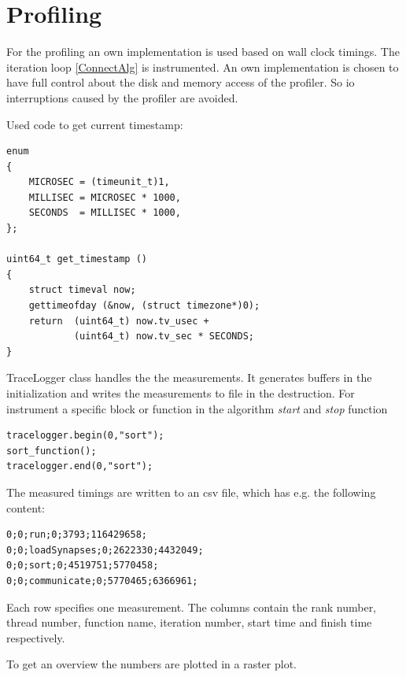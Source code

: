 %

\chapter{Profiling}

For the profiling an own implementation is used based on wall clock timings.
The iteration loop \ref{ConnectAlg} is instrumented. An own implementation is
chosen to have full control about the disk and memory access of the profiler.
So io interruptions caused by the profiler are avoided.

Used code to get current timestamp:

\begin{lstlisting}
enum
{
	MICROSEC = (timeunit_t)1,
	MILLISEC = MICROSEC * 1000,
	SECONDS  = MILLISEC * 1000,
};

uint64_t get_timestamp ()
{
    struct timeval now;
    gettimeofday (&now, (struct timezone*)0);
    return  (uint64_t) now.tv_usec + 
            (uint64_t) now.tv_sec * SECONDS;
}
\end{lstlisting}

TraceLogger class handles the the measurements.
It generates buffers in the initialization and writes the measurements to file in the destruction.
For instrument a specific block or function in the algorithm \emph{start} and \emph{stop} function
\begin{lstlisting}
tracelogger.begin(0,"sort");
sort_function();
tracelogger.end(0,"sort");
\end{lstlisting}

The measured timings are written to an csv file, which has e.g. the following content:
\begin{lstlisting}
0;0;run;0;3793;116429658;
0;0;loadSynapses;0;2622330;4432049;
0;0;sort;0;4519751;5770458;
0;0;communicate;0;5770465;6366961;
\end{lstlisting}


Each row specifies one measurement. The columns contain the rank number, thread number, function name,
iteration number, start time and finish time respectively.

To get an overview the numbers are plotted in a raster plot.

